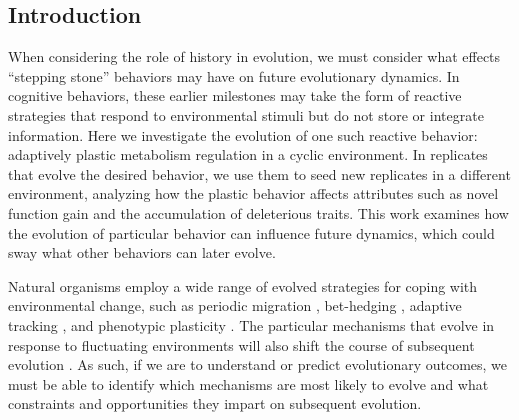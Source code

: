 \begin{raggedbottom} 


\section{Introduction}

When considering the role of history in evolution, we must consider what effects ``stepping stone'' behaviors may have on future evolutionary dynamics. 
In cognitive behaviors, these earlier milestones may take the form of reactive strategies that respond to environmental stimuli but do not store or integrate information. 
Here we investigate the evolution of one such reactive behavior: adaptively plastic metabolism regulation in a cyclic environment. 
In replicates that evolve the desired behavior, we use them to seed new replicates in a different environment, analyzing how the plastic behavior affects attributes such as novel function gain and the accumulation of deleterious traits. 
This work examines how the evolution of particular behavior can influence future dynamics, which could sway what other behaviors can later evolve. 

Natural organisms employ a wide range of evolved strategies for coping with environmental change, such as
periodic migration \citep{winger_long_2019},
bet-hedging \citep{beaumont_experimental_2009},
adaptive tracking \citep{barrett_adaptation_2008},
and phenotypic plasticity \citep{ghalambor_adaptive_2007}.
The particular mechanisms that evolve in response to fluctuating environments will also shift the course of subsequent evolution \citep{wennersten_population-level_2012,schaum_plasticity_2014}.
As such, if we are to understand or predict evolutionary outcomes, we must be able to identify which mechanisms are most likely to evolve and what constraints and opportunities they impart on subsequent evolution.


\end{raggedbottom}
